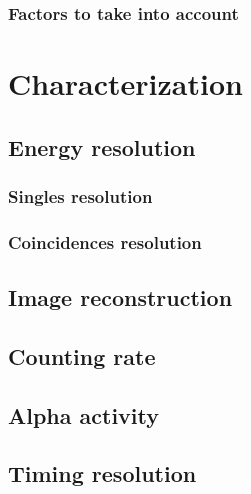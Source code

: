 \subsubsection{Factors to take into account}

\section{Characterization}\label{sec:characterization}

\subsection{Energy resolution}

\subsubsection{Singles resolution}

\subsubsection{Coincidences resolution}

\subsection{Image reconstruction}

\subsection{Counting rate}

\subsection{Alpha activity}

\subsection{Timing resolution}
